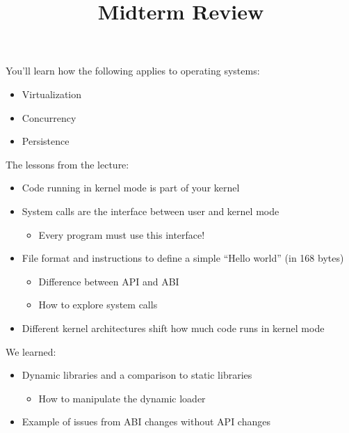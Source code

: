 

\title{Midterm Review}


  \begin{frame}
    \titlepage
  \end{frame}

  \begin{slide}

    You'll learn how the following applies to operating systems:
    \begin{itemize}
      \item Virtualization
      \item Concurrency
      \item Persistence
    \end{itemize}
  \end{slide}

  \begin{slide}

    The lessons from the lecture:
    \begin{itemize}
      \item Code running in kernel mode is part of your kernel
      \item System calls are the interface between user and kernel mode
        \begin{itemize}
          \item Every program must use this interface!
        \end{itemize}
      \item File format and instructions to define a simple ``Hello world''
            (in 168 bytes)
        \begin{itemize}
          \item Difference between API and ABI
          \item How to explore system calls
        \end{itemize}
      \item Different kernel architectures shift how much code runs in kernel
            mode
    \end{itemize}
  \end{slide}

  \begin{slide}

    We learned:
    \begin{itemize}
      \item Dynamic libraries and a comparison to static libraries
      \begin{itemize}
        \item How to manipulate the dynamic loader
      \end{itemize}
      \item Example of issues from ABI changes without API changes
    \end{itemize}

  \end{slide}

